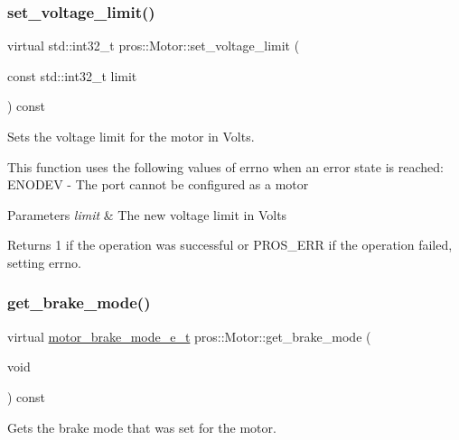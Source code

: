 \subsubsection{\texorpdfstring{set\+\_\+voltage\+\_\+limit()}{set\_voltage\_limit()}}
{\footnotesize\ttfamily virtual std\+::int32\+\_\+t pros\+::\+Motor\+::set\+\_\+voltage\+\_\+limit (\begin{DoxyParamCaption}\item[{const std\+::int32\+\_\+t}]{limit }\end{DoxyParamCaption}) const\hspace{0.3cm}{\ttfamily [virtual]}}



Sets the voltage limit for the motor in Volts. 

This function uses the following values of errno when an error state is reached\+: E\+N\+O\+D\+EV -\/ The port cannot be configured as a motor


\begin{DoxyParams}{Parameters}
{\em limit} & The new voltage limit in Volts\\
\hline
\end{DoxyParams}
\begin{DoxyReturn}{Returns}
1 if the operation was successful or P\+R\+O\+S\+\_\+\+E\+RR if the operation failed, setting errno. 
\end{DoxyReturn}
\mbox{\label{classpros_1_1Motor_acc0c2225d2b713b73e1caee1a483a958}} 
\subsubsection{\texorpdfstring{get\+\_\+brake\+\_\+mode()}{get\_brake\_mode()}}
{\footnotesize\ttfamily virtual \hyperlink{motors_8h_aa324a2881696428c9e3684f9ad23a83b}{motor\+\_\+brake\+\_\+mode\+\_\+e\+\_\+t} pros\+::\+Motor\+::get\+\_\+brake\+\_\+mode (\begin{DoxyParamCaption}\item[{void}]{ }\end{DoxyParamCaption}) const\hspace{0.3cm}{\ttfamily [virtual]}}



Gets the brake mode that was set for the motor. 


